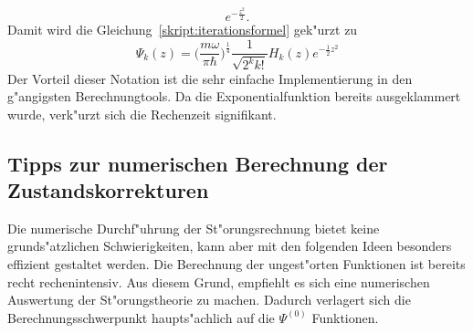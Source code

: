 \begin{refsection}
\[e^{-\frac{z^2}2}.
\]
Damit wird die Gleichung~\ref{skript:iterationsformel} gek"urzt zu
\begin{equation}
\Psi_k(z)
=
\biggl(\frac{m\omega}{\pi\hbar}\biggr)^\frac14
\frac1{\sqrt{2^k k!}}H_k(z)
e^{-\frac12 z^2}
\end{equation}
Der Vorteil dieser Notation ist die sehr einfache Implementierung
in den g"angigsten Berechnungtools.
Da die Exponentialfunktion bereits ausgeklammert wurde, verk"urzt sich die Rechenzeit
signifikant.
\subsection{Tipps zur numerischen Berechnung der Zustandskorrekturen}
Die numerische Durchf"uhrung der St"orungsrechnung bietet keine grunds"atzlichen 
Schwierigkeiten, kann aber mit den folgenden Ideen besonders effizient 
gestaltet werden.
Die Berechnung der ungest"orten Funktionen ist bereits recht rechenintensiv.
Aus diesem Grund,
empfiehlt es sich eine numerischen Auswertung der St"orungstheorie zu machen.
Dadurch verlagert sich die Berechnungsschwerpunkt
haupts"achlich auf die $\Psi^{(0)}$ Funktionen.

\end{refsection}
